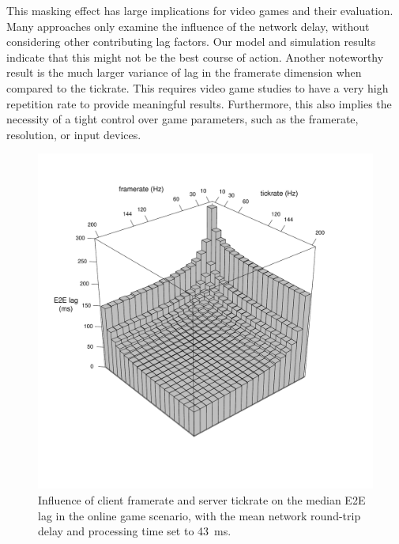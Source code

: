 This masking effect has large implications for video games and their evaluation. Many approaches only examine the influence of the network delay, without considering other contributing lag factors. Our model and simulation results indicate that this might not be the best course of action. Another noteworthy result is the much larger variance of lag in the framerate dimension when compared to the tickrate. This requires video game studies to have a very high repetition rate to provide meaningful results. Furthermore, this also implies the necessity of a tight control over game parameters, such as the framerate, resolution, or input devices.

\begin{figure}[!t]
	\centering
	\vspace{-6mm}
	\includegraphics[width=1.0\columnwidth]{../../../simulation/visualization/e2e-lag-3dbars.pdf}
	\vspace{-15mm}
	\caption{Influence of client framerate and server tickrate on the median \gls{E2E} lag in the online game scenario, with the mean network round-trip delay and processing time set to \SI{43}{\ms}.}
\label{fig:3dbars-framerate-tickrate-lag}
\end{figure}

